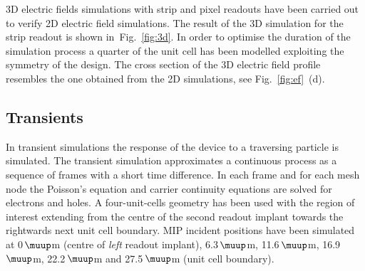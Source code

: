 \documentclass[a4paper,11pt]{article}
\begin{document}
3D electric fields simulations with strip and pixel readouts have been carried out to verify 2D electric field simulations.
The result of the 3D simulation for the strip readout is shown in~Fig.~\ref{fig:3d}.
In order to optimise the duration of the simulation process a quarter of the unit cell has been modelled exploiting the symmetry of the design.
The cross section of the 3D electric field profile resembles the one obtained from the 2D simulations, see Fig.~\ref{fig:ef}~(d). 



\subsection{Transients}
\label{sec:tr}
In transient simulations the response of the device to a traversing particle is simulated. 
The transient simulation approximates a continuous process as a sequence of frames with a short time difference. 
In each frame and for each mesh node the Poisson's equation and carrier continuity equations are solved for electrons and holes.
A four-unit-cells geometry has been used with the region of interest extending from the centre of the second readout implant towards the rightwards next unit cell boundary.  
MIP incident positions have been simulated at 0\,$\muup$m (centre of \textit{left} readout implant), 6.3\,$\muup$m, 11.6\,$\muup$m, 16.9\,$\muup$m, 22.2\,$\muup$m and 27.5\,$\muup$m (unit cell boundary).
\end{document}
